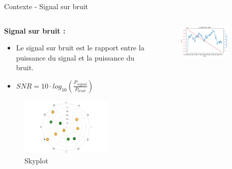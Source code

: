 \documentclass[xcolor=dvipsnames,envcountsect]{beamer}
\begin{document}
\begin{frame}{Contexte - Signal sur bruit}
	\begin{columns}
		\begin{column}{0.5\textwidth}
			\textbf{Signal sur bruit :} 
			\begin{itemize}
				\item Le signal sur bruit est le rapport entre la puissance du signal et la puissance du bruit.
				\item $SNR = 10 \cdot log_{10}(\frac{P_{signal}}{P_{bruit}})$
			\end{itemize}
			\begin{figure}
				\centering
				\includegraphics[width=0.8\textwidth]{./Figures/skyplot.jpg}
				\caption {Skyplot}
			\end{figure}
		\end{column}
		\begin{column}{0.5\textwidth}
			\begin{figure}
				\includegraphics[width=0.8\textwidth]{./Figures/G08_L1.png}

\end{figure}
\end{column}
\end{columns}
\end{frame}
\end{document}
